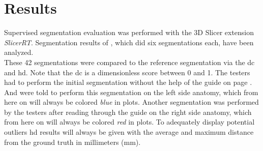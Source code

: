 
\chapter{Results}\label{c:results}
Supervised segmentation evaluation was performed with the 3D Slicer extension \textit{SlicerRT}.
Segmentation results of \noTesters, which did six segmentations each, have been analyzed.\\
These 42 segmentations were compared to the reference segmentation via the \acrlong{dc} and \acrlong{hd}.
Note that the \acrlong{dc} is a dimensionless score between 0 and 1.
The testers had to perform the initial segmentation without the help of the guide on page \pageref{a:guide}.
And were told to perform this segmentation on the left side anatomy,
which from here on will always be colored \textit{blue} in plots.
Another segmentation was performed by the testers after reading through the guide on the right side anatomy,
which from here on will always be colored \textit{red} in plots.
To adequately display potential outliers \acrfull{hd} results will always be given with the average and maximum distance from the ground truth in millimeters (mm).


